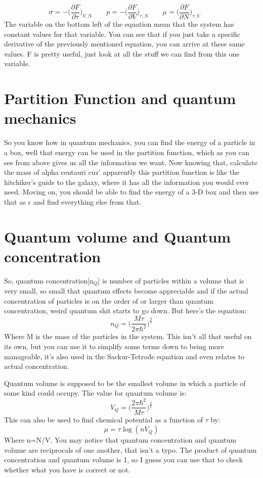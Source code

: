 \documentclass[arial]{article}
\begin{document}
\begin{equation}
\sigma=-\bigg(\frac{\partial F}{\partial \tau}\bigg)_{V,N}\qquad
p=-\bigg(\frac{\partial F}{\partial V}\bigg)_{\tau,N}\qquad
\mu=\bigg(\frac{\partial F}{\partial N}\bigg)_{\tau,V}\qquad
\end{equation}
The variable on the bottom left of the equation mean that the system has constant values for that variable. You can see that if you just take a specific derivative of the previously mentioned equation, you can arrive at these same values. F is pretty useful, just look at all the stuff we can find from this one variable.

\section*{Partition Function and quantum mechanics}
So you know how in quantum mechanics, you can find the energy of a particle in a box, well that energy can be used in the partition function, which as you can see from above gives us all the information we want. Now knowing that, calculate the mass of alpha centauri cuz' apparently this partition function is like the hitchiker's guide to the galaxy, where it has all the information you would ever need. Moving on, you should be able to find the energy of a 3-D box and then use that as $\epsilon$ and find everything else from that.

\section*{Quantum volume and Quantum concentration}
So, quantum concentration[n$_Q$] is number of particles within a volume that is very small, so small that quantum effects become appreciable and if the actual concentration of particles is on the order of or larger than quantum concentration, weird quantum shit starts to go down. But here's the equation:
\begin{equation}
n_Q=\bigg(\frac{M \tau}{2\pi \hbar^2}\bigg)^{\frac{3}{2}}
\end{equation}
Where M is the mass of the particles in the system. This isn't all that useful on its own, but you can use it to simplify some terms down to being more manageable, it's also used in the Sackur-Tetrode equation and even relates to actual concentration.
\vspace{3mm}

Quantum volume is supposed to be the smallest volume in which a particle of some kind could occupy. The value for quantum volume is:
\begin{equation}
V_Q=\bigg( \frac{2\pi \hbar^2}{M\tau	} \bigg)^{\frac{3}{2}}
\end{equation}
This can also be used to find chemical potential as a function of $\tau$ by:
\begin{equation}
\mu = \tau \log	(n V_Q)
\end{equation}
Where n=N/V. You may notice that quantum concentration and quantum volume are reciprocals of one another, that isn't a typo. The product of quantum concentration and quantum volume is 1, so I guess you can use that to check whether what you have is correct or not.
\end{document}
